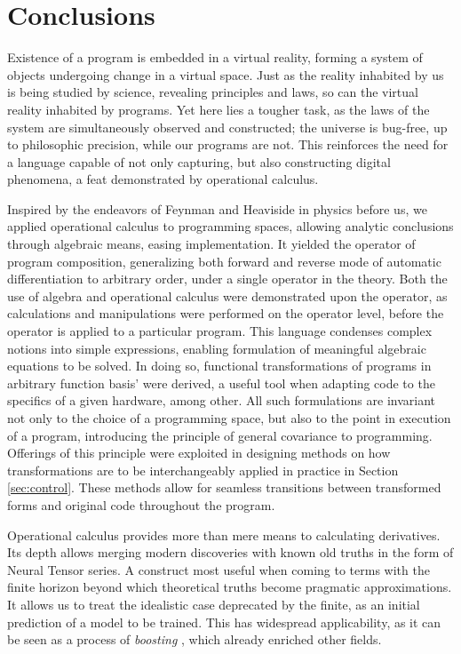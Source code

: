 \documentclass[smallcondensed]{svjour3}
\begin{document}
\section{Conclusions}

Existence of a program is embedded in a virtual reality, forming a system of objects undergoing change in a virtual space. Just as the reality inhabited by us is being studied by science, revealing principles and laws, so can the virtual reality inhabited by programs. Yet here lies a tougher task, as the laws of the system are simultaneously observed and constructed; the universe is bug-free, up to philosophic precision, while our programs are not. This reinforces the need for a language capable of not only capturing, but also constructing digital phenomena, a feat demonstrated by operational calculus. 

Inspired by the endeavors of Feynman \cite{Feynman} and Heaviside \cite{HeavisideOperational} in physics before us, we applied operational calculus to programming spaces, allowing analytic conclusions through algebraic means, easing implementation. It yielded the operator of program composition, generalizing both forward \cite{PcAD} and reverse \cite{ReverseAD} mode of automatic differentiation to arbitrary order, under a single operator in the theory. Both the use of algebra and operational calculus were demonstrated upon the operator, as calculations and manipulations were performed on the operator level, before the operator is applied to a particular program.
This language condenses complex notions into simple expressions, enabling formulation of meaningful algebraic equations to be solved. In doing so, functional transformations of programs in arbitrary function basis' were derived, a useful tool when adapting code to the specifics of a given hardware, among other.
All such formulations are invariant not only to the choice of a programming space, but also to the point in execution of a program, introducing the principle of general covariance \cite{GeneralCovariance} to programming. Offerings of this principle were exploited in designing methods on how transformations are to be interchangeably applied in practice in Section \ref{sec:control}. These methods allow for seamless transitions between transformed forms and original code throughout the program.

Operational calculus provides more than mere means to calculating derivatives. Its depth allows merging modern discoveries with known old truths in the form of Neural Tensor series. A construct most useful when coming to terms with the finite horizon beyond which theoretical truths become pragmatic approximations. It allows us to treat the idealistic case deprecated by the finite, as an initial prediction of a model to be trained. This has widespread applicability, as it can be seen as a process of \emph{boosting} \cite{boosting}, which already enriched other fields. 
\end{document}
